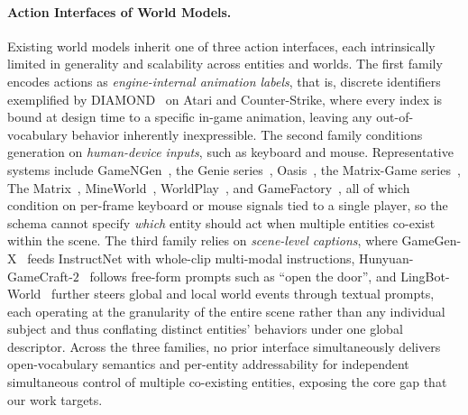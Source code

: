 \paragraph{Action Interfaces of World Models.}
Existing world models inherit one of three action interfaces, each intrinsically limited
in generality and scalability across entities and worlds.
The first family encodes actions as \emph{engine-internal animation labels}, that is,
discrete identifiers exemplified by DIAMOND~\citep{alonso2024diffusion} on
Atari and Counter-Strike, where every index is bound at design time to a specific
in-game animation, leaving any out-of-vocabulary behavior inherently inexpressible.
The second family conditions generation on \emph{human-device inputs}, such as keyboard and mouse.
Representative systems include GameNGen~\citep{valevski2024diffusion},
the Genie series~\citep{bruce2024genie, parkerholder2024genie2, parkerholder2025genie3},
Oasis~\citep{oasis2024}, the Matrix-Game series~\citep{zhang2025matrixgame, he2025matrixgame2},
The Matrix~\citep{feng2024matrix}, MineWorld~\citep{guo2025mineworld},
WorldPlay~\citep{sun2025worldplay}, and GameFactory~\citep{yu2025gamefactory},
all of which condition on per-frame keyboard or mouse signals tied to a single player, so the schema cannot specify \emph{which} entity should act when
multiple entities co-exist within the scene.
The third family relies on \emph{scene-level captions}, where
GameGen-X~\citep{che2024gamegenx} feeds InstructNet with whole-clip multi-modal
instructions, Hunyuan-GameCraft-$2$~\citep{tang2025hunyuan} follows free-form prompts
such as ``open the door'', and LingBot-World~\citep{team2026advancing} further steers
global and local world events through textual prompts, each operating at the granularity
of the entire scene rather than any individual subject and thus conflating distinct
entities' behaviors under one global descriptor.
Across the three families, no prior interface simultaneously delivers open-vocabulary
semantics and per-entity addressability for independent simultaneous control of
multiple co-existing entities, exposing the core gap that our work targets.


